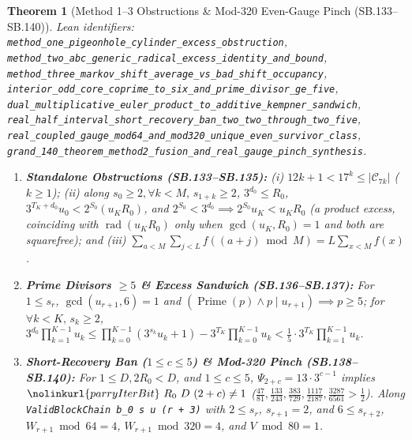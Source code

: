 \documentclass[11pt]{article}
\newtheorem{theorem}{Theorem}[section]
\begin{document}
\begin{theorem}[Method 1--3 Obstructions \& Mod-320 Even-Gauge Pinch (SB.133--SB.140)]
\emph{Lean identifiers:} \nolinkurl{method_one_pigeonhole_cylinder_excess_obstruction}, \nolinkurl{method_two_abc_generic_radical_excess_identity_and_bound}, \nolinkurl{method_three_markov_shift_average_vs_bad_shift_occupancy}, \nolinkurl{interior_odd_core_coprime_to_six_and_prime_divisor_ge_five}, \nolinkurl{dual_multiplicative_euler_product_to_additive_kempner_sandwich}, \nolinkurl{real_half_interval_short_recovery_ban_two_two_through_two_five}, \nolinkurl{real_coupled_gauge_mod64_and_mod320_unique_even_survivor_class}, \nolinkurl{grand_140_theorem_method2_fusion_and_real_gauge_pinch_synthesis}.
\begin{enumerate}
  \item \textbf{Standalone Obstructions (SB.133--SB.135):} (i) $12 k + 1 < 17^k \le |\mathcal{C}_{7k}|$ ($k \ge 1$); (ii) along $s_0 \ge 2, \forall k < M,\, s_{1+k} \ge 2$, $3^{d_0} \le R_0$, $3^{T_K+d_0} u_0 < 2^{S_0}(u_K R_0)$, and $2^{S_0} < 3^{d_0} \implies 2^{S_0} u_K < u_K R_0$ (a product excess, coinciding with $\operatorname{rad}(u_K R_0)$ only when $\gcd(u_K, R_0) = 1$ and both are squarefree); and (iii) $\sum_{a < M} \sum_{j < L} f((a+j) \bmod M) = L \sum_{x < M} f(x)$.
  \item \textbf{Prime Divisors $\ge 5$ \& Excess Sandwich (SB.136--SB.137):} For $1 \le s_r$, $\gcd(u_{r+1}, 6) = 1$ and $(\operatorname{Prime}(p) \wedge p \mid u_{r+1}) \implies p \ge 5$; for $\forall k < K,\, s_k \ge 2$, $3^{d_0} \prod_{k=1}^{K-1} u_k \le \prod_{k=0}^{K-1}(3^{s_k} u_k + 1) - 3^{T_K} \prod_{k=0}^{K-1} u_k < \frac{1}{5} \cdot 3^{T_K} \prod_{k=1}^{K-1} u_k$.
  \item \textbf{Short-Recovery Ban ($1 \le c \le 5$) \& Mod-320 Pinch (SB.138--SB.140):} For $1 \le D, 2 R_0 < D$, and $1 \le c \le 5$, $\Psi_{2+c} = 13 \cdot 3^{c-1}$ implies $\nolinkurl{parryIterBit}\ R_0\ D\ (2+c) \ne 1$ ($\frac{47}{81}, \frac{133}{243}, \frac{383}{729}, \frac{1117}{2187}, \frac{3287}{6561} > \frac{1}{2}$). Along \texttt{ValidBlockChain b\_0 s u (r + 3)} with $2 \le s_r$, $s_{r+1} = 2$, and $6 \le s_{r+2}$, $W_{r+1} \bmod 64 = 4$, $W_{r+1} \bmod 320 = 4$, and $V \bmod 80 = 1$.
\end{enumerate}
\end{theorem}
\end{document}
